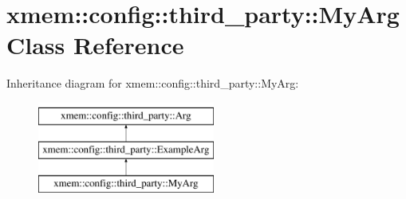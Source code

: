 \hypertarget{classxmem_1_1config_1_1third__party_1_1_my_arg}{}\section{xmem\+:\+:config\+:\+:third\+\_\+party\+:\+:My\+Arg Class Reference}
\label{classxmem_1_1config_1_1third__party_1_1_my_arg}
Inheritance diagram for xmem\+:\+:config\+:\+:third\+\_\+party\+:\+:My\+Arg\+:\begin{figure}[H]
\begin{center}
\leavevmode
\includegraphics[height=3.000000cm]{classxmem_1_1config_1_1third__party_1_1_my_arg}
\end{center}
\end{figure}

